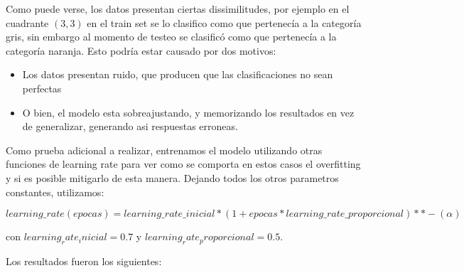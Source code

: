Como puede verse, los datos presentan ciertas dissimilitudes, por ejemplo en el cuadrante $(3,3)$ en el train set se lo clasifico como que pertenecía a la categoría gris, sin embargo al momento de testeo se clasificó como que pertenecía a la categoría naranja. Esto podría estar causado por dos motivos:

\begin{itemize}
\item Los datos presentan ruido, que producen que las clasificaciones no sean perfectas
\item O bien, el modelo esta sobreajustando, y memorizando los resultados en vez de generalizar, generando asi respuestas erroneas.
\end{itemize}

Como prueba adicional a realizar, entrenamos el modelo utilizando otras funciones de learning rate para ver como se comporta en estos casos el overfitting y si es posible mitigarlo de esta manera. Dejando todos los otros parametros constantes, utilizamos:

$$learning\_rate(epocas) = learning\_rate\_inicial * (1 + epocas * learning\_rate\_proporcional) ** -(\alpha)$$

con $learning_rate_inicial=0.7$  y $learning_rate_proporcional=0.5$.

Los resultados fueron los siguientes:


